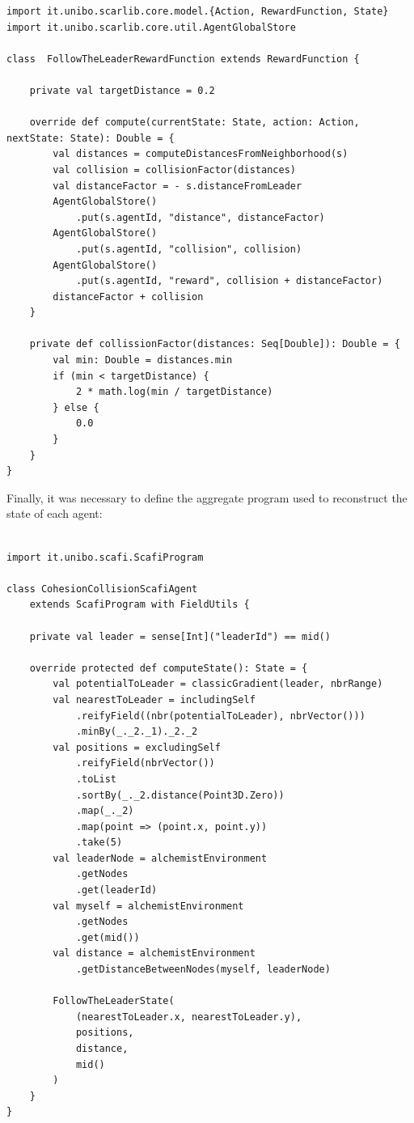 \documentclass[12pt,a4paper,openright,twoside]{book}
\begin{document}
\begin{lstlisting}
import it.unibo.scarlib.core.model.{Action, RewardFunction, State}
import it.unibo.scarlib.core.util.AgentGlobalStore

class  FollowTheLeaderRewardFunction extends RewardFunction {

    private val targetDistance = 0.2

    override def compute(currentState: State, action: Action, nextState: State): Double = {
        val distances = computeDistancesFromNeighborhood(s)
        val collision = collisionFactor(distances)
        val distanceFactor = - s.distanceFromLeader
        AgentGlobalStore()
            .put(s.agentId, "distance", distanceFactor)
        AgentGlobalStore()
            .put(s.agentId, "collision", collision)
        AgentGlobalStore()
            .put(s.agentId, "reward", collision + distanceFactor)
        distanceFactor + collision
    }

    private def collissionFactor(distances: Seq[Double]): Double = {
        val min: Double = distances.min
        if (min < targetDistance) {
            2 * math.log(min / targetDistance)
        } else {
            0.0
        }
    }
}
\end{lstlisting}
Finally, it was necessary to define the aggregate program used to reconstruct the state of each agent:
\begin{lstlisting}

import it.unibo.scafi.ScafiProgram

class CohesionCollisionScafiAgent 
    extends ScafiProgram with FieldUtils {

    private val leader = sense[Int]("leaderId") == mid()

    override protected def computeState(): State = {
        val potentialToLeader = classicGradient(leader, nbrRange)
        val nearestToLeader = includingSelf
            .reifyField((nbr(potentialToLeader), nbrVector()))
            .minBy(_._2._1)._2._2
        val positions = excludingSelf
            .reifyField(nbrVector())
            .toList
            .sortBy(_._2.distance(Point3D.Zero))
            .map(_._2)
            .map(point => (point.x, point.y))
            .take(5)
        val leaderNode = alchemistEnvironment
            .getNodes
            .get(leaderId)
        val myself = alchemistEnvironment
            .getNodes
            .get(mid())
        val distance = alchemistEnvironment
            .getDistanceBetweenNodes(myself, leaderNode)

        FollowTheLeaderState(
            (nearestToLeader.x, nearestToLeader.y), 
            positions, 
            distance, 
            mid()
        )
    }
}    
\end{lstlisting}
\end{document}
